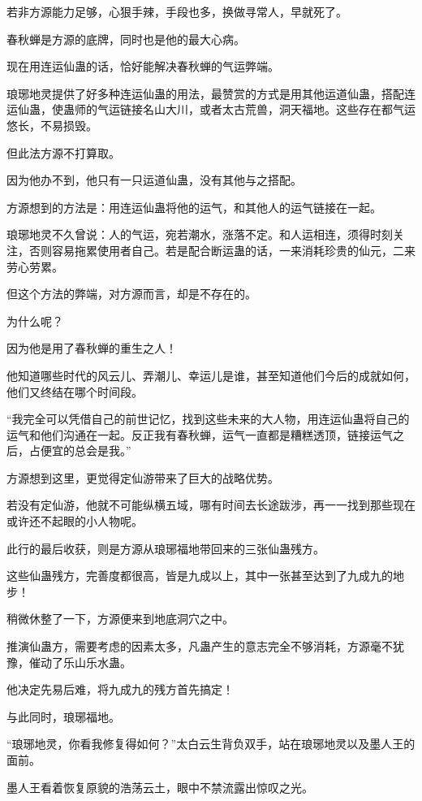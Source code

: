 \begin{this_body}
若非方源能力足够，心狠手辣，手段也多，换做寻常人，早就死了。

春秋蝉是方源的底牌，同时也是他的最大心病。

现在用连运仙蛊的话，恰好能解决春秋蝉的气运弊端。

琅琊地灵提供了好多种连运仙蛊的用法，最赞赏的方式是用其他运道仙蛊，搭配连运仙蛊，使蛊师的气运链接名山大川，或者太古荒兽，洞天福地。这些存在都气运悠长，不易损毁。

但此法方源不打算取。

因为他办不到，他只有一只运道仙蛊，没有其他与之搭配。

方源想到的方法是：用连运仙蛊将他的运气，和其他人的运气链接在一起。

琅琊地灵不久曾说：人的气运，宛若潮水，涨落不定。和人运相连，须得时刻关注，否则容易拖累使用者自己。若是配合断运蛊的话，一来消耗珍贵的仙元，二来劳心劳累。

但这个方法的弊端，对方源而言，却是不存在的。

为什么呢？

因为他是用了春秋蝉的重生之人！

他知道哪些时代的风云儿、弄潮儿、幸运儿是谁，甚至知道他们今后的成就如何，他们又终结在哪个时间段。

“我完全可以凭借自己的前世记忆，找到这些未来的大人物，用连运仙蛊将自己的运气和他们沟通在一起。反正我有春秋蝉，运气一直都是糟糕透顶，链接运气之后，占便宜的总会是我。”

方源想到这里，更觉得定仙游带来了巨大的战略优势。

若没有定仙游，他就不可能纵横五域，哪有时间去长途跋涉，再一一找到那些现在或许还不起眼的小人物呢。

此行的最后收获，则是方源从琅琊福地带回来的三张仙蛊残方。

这些仙蛊残方，完善度都很高，皆是九成以上，其中一张甚至达到了九成九的地步！

稍微休整了一下，方源便来到地底洞穴之中。

推演仙蛊方，需要考虑的因素太多，凡蛊产生的意志完全不够消耗，方源毫不犹豫，催动了乐山乐水蛊。

他决定先易后难，将九成九的残方首先搞定！

与此同时，琅琊福地。

“琅琊地灵，你看我修复得如何？”太白云生背负双手，站在琅琊地灵以及墨人王的面前。

墨人王看着恢复原貌的浩荡云土，眼中不禁流露出惊叹之光。


\end{this_body}

